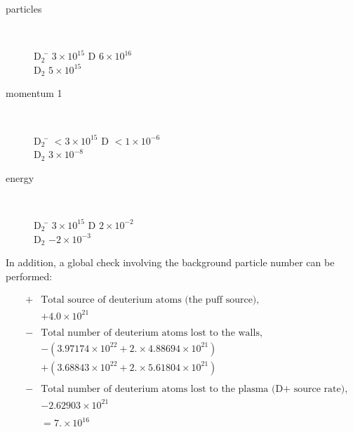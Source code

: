 \documentclass[12pt]{report}
\begin{document}
\begin{enumerate}
\begin{description}
  \item[particles] \ \\ 
  \begin{tabbing}
       D$_{2}$ \qquad \= $3 \times 10^{15}$ \kill
       D \>  $6 \times 10^{16}$  \\
       D$_{2}$ \> $5 \times 10^{15}$ \\
  \end{tabbing}
  \item[momentum 1] \ \\
  \begin{tabbing}
       D$_{2}$ \qquad \= $< 3 \times 10^{15}$ \kill
       D  \> $< 1 \times 10^{-6}$ \\
       D$_{2}$ \> $3 \times 10^{-8}$ \\
  \end{tabbing}
  \item[energy] \ \\
  \begin{tabbing}
       D$_{2}$ \qquad \= $3 \times 10^{15}$ \kill
       D \> $2 \times 10^{-2}$ \\
       D$_{2}$ \> $-2 \times 10^{-3}$ \\
  \end{tabbing}
\end{description}

In addition, a global check involving the background particle number can 
be performed:

\begin{eqnarray*}
  &+& \mbox{Total source of deuterium atoms (the puff source),} \\
  & &    +4.0 \times 10^{21} \\
  & &  \\
  &-& \mbox{Total number of deuterium atoms lost to the walls,} \\
  & &   -(3.97174 \times 10^{22} + 2. \times 4.88694 \times 10^{21}) \\
  & & + (3.68843 \times 10^{22} + 2. \times 5.61804 \times 10^{21}) \\
  & &  \\
  &-& \mbox{Total number of deuterium atoms lost to the plasma (D+ source rate),} \\
  & & - 2.62903 \times 10^{21}  \\
  & &  \\
  & & = 7. \times 10^{16} \\
\end{eqnarray*}


\end{enumerate}
\end{document}
